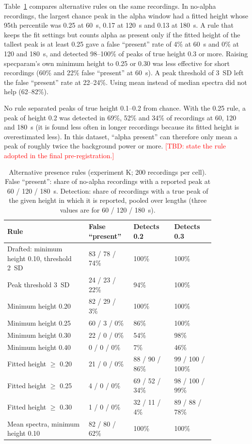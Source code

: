 \documentclass[11pt,a4paper]{article}
\newcommand{\TBD}[1]{\textcolor{red}{[TBD: #1]}}
\begin{document}
Table~\ref{tab:simrules} compares alternative rules on the same recordings. In no-alpha
recordings, the largest chance peak in the alpha window had a fitted height whose 95th
percentile was 0.25 at 60~s, 0.17 at 120~s and 0.13 at 180~s. A rule that keeps the fit
settings but counts alpha as present only if the fitted height of the tallest peak is at
least 0.25 gave a false ``present'' rate of 4\% at 60~s and 0\% at 120 and 180~s, and
detected 98--100\% of peaks of true height 0.3 or more. Raising specparam's own minimum
height to 0.25 or 0.30 was less effective for short recordings (60\% and 22\% false
``present'' at 60~s). A peak threshold of 3~SD left the false ``present'' rate at 22--24\%.
Using mean instead of median spectra did not help (62--82\%).

No rule separated peaks of true height 0.1--0.2 from chance. With the 0.25 rule, a peak of
height 0.2 was detected in 69\%, 52\% and 34\% of recordings at 60, 120 and 180~s (it is
found less often in longer recordings because its fitted height is overestimated less).
In this dataset, ``alpha present'' can therefore only mean a peak of roughly twice the
background power or more. \TBD{state the rule adopted in the final pre-registration.}

\begin{table}[ht]
\centering
\caption{Alternative presence rules (experiment K; 200 recordings per cell). False
``present'': share of no-alpha recordings with a reported peak at 60 / 120 / 180~s.
Detection: share of recordings with a true peak of the given height in which it is
reported, pooled over lengths (three values are for 60 / 120 / 180~s).}
\label{tab:simrules}
\begin{tabular}{p{0.34\linewidth}p{0.17\linewidth}p{0.17\linewidth}p{0.17\linewidth}}
\toprule
Rule & False ``present'' & Detects 0.2 & Detects 0.3 \\
\midrule
Drafted: minimum height 0.10, threshold 2~SD & 83 / 78 / 74\% & 100\% & 100\% \\
Peak threshold 3~SD & 24 / 23 / 22\% & 94\% & 100\% \\
Minimum height 0.20 & 82 / 29 / 3\% & 100\% & 100\% \\
Minimum height 0.25 & 60 / 3 / 0\% & 86\% & 100\% \\
Minimum height 0.30 & 22 / 0 / 0\% & 54\% & 98\% \\
Minimum height 0.40 & 0 / 0 / 0\% & 7\% & 46\% \\
Fitted height $\geq$ 0.20 & 21 / 0 / 0\% & 88 / 90 / 86\% & 99 / 100 / 100\% \\
Fitted height $\geq$ 0.25 & 4 / 0 / 0\% & 69 / 52 / 34\% & 98 / 100 / 99\% \\
Fitted height $\geq$ 0.30 & 1 / 0 / 0\% & 32 / 11 / 4\% & 89 / 88 / 78\% \\
Mean spectra, minimum height 0.10 & 82 / 80 / 62\% & 100\% & 100\% \\
\bottomrule
\end{tabular}
\end{table}
\end{document}
